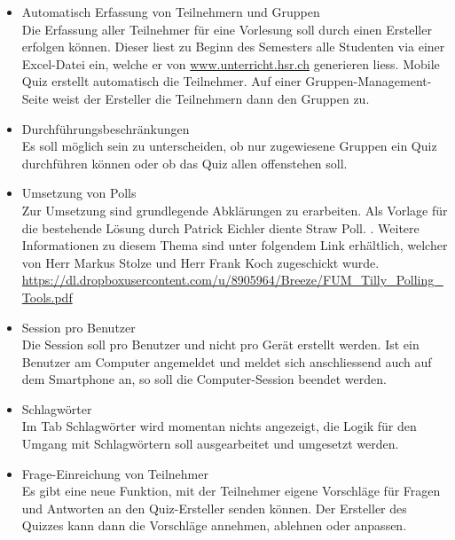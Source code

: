 \begin{itemize}
\begin{itemize}
		\item Ergänzung des Auswertungs-Screens\\
		In den Auswertungen für den Ersteller soll nebst den totalen Anzahl Stimmen einer Antwort auch der prozentuale Anteil angegeben sein. So kann direkt abgelesen werden, wie viele der Teilnehmer sich der Antwort enthalten haben, also \glqq keine Antwort\grqq angewählt haben.
	\end{itemize}
	
	\item Automatisch Erfassung von Teilnehmern und Gruppen \\
	Die Erfassung aller Teilnehmer für eine Vorlesung soll durch einen Ersteller erfolgen können. Dieser liest zu Beginn des Semesters alle Studenten via einer Excel-Datei ein, welche er von \url{www.unterricht.hsr.ch} generieren liess. Mobile Quiz erstellt automatisch die Teilnehmer. Auf einer Gruppen-Management-Seite weist der Ersteller die Teilnehmern dann den Gruppen zu.
	
	\item Durchführungsbeschränkungen \\
	Es soll möglich sein zu unterscheiden, ob nur zugewiesene Gruppen ein Quiz durchführen können oder ob das Quiz allen offenstehen soll.
	
	\item Umsetzung von Polls \\
	Zur Umsetzung sind  grundlegende Abklärungen zu erarbeiten.
	Als Vorlage für die bestehende Lösung durch Patrick Eichler diente \glqq Straw Poll\grqq . \cite{straw_poll}. Weitere Informationen zu diesem Thema sind unter folgendem Link erhältlich, welcher von Herr Markus Stolze und Herr Frank Koch zugeschickt wurde. \url{https://dl.dropboxusercontent.com/u/8905964/Breeze/FUM_Tilly_Polling_Tools.pdf}
	
	\item Session pro Benutzer \\
	Die Session soll pro Benutzer und nicht pro Gerät erstellt werden. Ist ein Benutzer am Computer angemeldet und meldet sich anschliessend auch auf dem Smartphone an, so soll die Computer-Session beendet werden.
	
	\item Schlagwörter \\
	Im Tab Schlagwörter wird momentan nichts angezeigt, die Logik für den Umgang mit Schlagwörtern soll ausgearbeitet und umgesetzt werden.
	
	\item Frage-Einreichung von Teilnehmer \\
	Es gibt eine neue Funktion, mit der Teilnehmer eigene Vorschläge für Fragen und Antworten an den Quiz-Ersteller senden können. Der Ersteller des Quizzes kann dann die Vorschläge annehmen, ablehnen oder anpassen.
	

\end{itemize}
